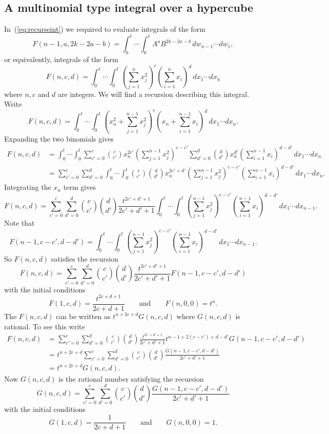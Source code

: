 \documentclass[journal, onecolumn, 11pt]{IEEEtran}
\begin{document}
\appendix


\subsection{A multinomial type integral over a hypercube}\label{sec:mult-type-integr}

In~(\ref{eq:recurseint}) we required to evaluate integrals of the form
\[
F(n-1,a,2k - 2a - b) = \int^{t}_{0} \cdots \int^{t}_{0} A^a B^{2k - 2a - b} \,dw_{n-1}\cdots dw_{1},
\]
or equivalently, integrals of the form
\[
F(n,c,d) = \int^{t}_{0} \cdots \int^{t}_{0} \left(\sum_{j=1}^{n} x_j^2\right)^c \left( \sum_{i=1}^{n} x_i \right)^d \,dx_1\cdots dx_{n}
\]
where $n,c$ and $d$ are integers.  We will find a recursion describing this integral.  Write
\[
F(n,c,d) = \int^t_0 \cdots \int^t_0 \left(x_n^2 + \sum_{j=1}^{n-1} x_j^2\right)^c \left( x_n + \sum_{i=1}^{n-1} x_i \right)^d \,dx_1\cdots dx_n.
\]
Expanding the two binomials gives
\begin{align*}
F(n,c,d) &=  \int^t_0 \cdots \int^t_0 \sum_{c'=0}^{c} \binom{c}{c'} x_n^{2c'} \left(\sum_{j=1}^{n-1} x_j^2\right)^{c-c'}  \sum_{d'=0}^{d}\binom{d}{d'} x_n^{d'} \left(\sum_{i=1}^{n-1} x_i \right)^{d-d'} \,dx_1\cdots dx_{n} \\
&=  \sum_{c'=0}^{c} \sum_{d'=0}^d \int^t_0 \cdots \int^t_0 \binom{c}{c'} \binom{d}{d'} x_n^{2c'+d'} \left(\sum_{j=1}^{n-1} x_j^2\right)^{c-c'} \left(\sum_{i=1}^{n-1} x_i \right)^{d-d'} \,dx_1\cdots dx_{n}.
\end{align*}
Integrating the $x_n$ term gives
\[
F(n,c,d) = \sum_{c'=0}^{c} \sum_{d'=0}^{d} \binom{c}{c'}\binom{d}{d'} \frac{t^{2c'+d'+1}}{2c'+d'+1} \int^t_0 \cdots \int^t_0 \left(\sum_{j=1}^{n-1}x_j^2\right)^{c-c'}\left(\sum_{i=1}^{n-1} x_i \right)^{d-d'} \,dx_1\cdots dx_{n-1}.
\]
Note that
\[
F(n-1,c-c',d-d')  = \int^t_0 \cdots \int^t_0 \left(\sum_{j=1}^{n-1}x_j^2\right)^{c-c'}\left(\sum_{i=1}^{n-1} x_i \right)^{d-d'} \,dx_1\cdots dx_{n-1}.
\]
So $F(n,c,d)$ satisfies the recursion
\[
F(n,c,d) = \sum_{c'=0}^{c} \sum_{d'=0}^{d} \binom{c}{c'}\binom{d}{d'} \frac{t^{2c'+d'+1}}{2c'+d'+1}F(n-1,c-c',d-d')
\]
with the initial conditions
\[
F(1,c,d) = \frac{t^{2c+d+1}}{2c+d+1} \qquad \text{and} \qquad F(n,0,0) = t^n.
\]
The $F(n,c,d)$ can be written as $t^{n+2c+d}G(n,c,d)$ where $G(n,c,d)$ is rational.  To see this write
\begin{align*}
F(n,c,d) &=  \sum_{c'=0}^{c} \sum_{d'=0}^{d} \binom{c}{c'}\binom{d}{d'} \frac{t^{2c'+d'+1}}{2c'+d'+1}t^{n-1+2(c-c')+d-d'}G(n-1,c-c',d-d') \\
&=  t^{n+2c+d}\sum_{c'=0}^{c} \sum_{d'=0}^{d} \binom{c}{c'}\binom{d}{d'} \frac{G(n-1,c-c',d-d')}{2c'+d'+1} \\
&=  t^{n+2c+d}G(n,c,d).
\end{align*}
Now $G(n,c,d)$ is the rational number satisfying the recursion
\[
G(n,c,d) = \sum_{c'=0}^{c} \sum_{d'=0}^{d} \binom{c}{c'}\binom{d}{d'} \frac{G(n-1,c-c',d-d')}{2c'+d'+1}
\]
with the initial conditions
\[
G(1,c,d) = \frac{1}{2c+d+1} \qquad \text{and} \qquad G(n,0,0) = 1.
\]
\end{document}
